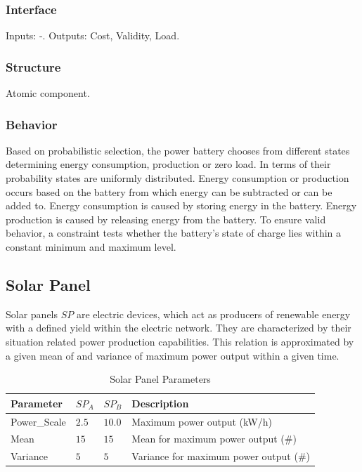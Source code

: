 \subsubsection{Interface}

Inputs: -. Outputs: Cost, Validity, Load.

\subsubsection{Structure}

Atomic component.

\subsubsection{Behavior}

Based on probabilistic selection, the power battery chooses from different states determining energy consumption, production or zero load. In terms of their probability states are uniformly distributed. Energy consumption or production occurs based on the battery from which energy can be subtracted or can be added to. Energy consumption is caused by storing energy in the battery. Energy production is caused by releasing energy from the battery. To ensure valid behavior, a constraint tests whether the battery's state of charge lies within a constant minimum and maximum level.

\subsection{Solar Panel}

Solar panels $SP$ are electric devices, which act as producers of renewable energy with a defined yield within the electric network. They are characterized by their situation related power production capabilities. This relation is approximated by a given mean of and variance of maximum power output within a given time.

\begin{table}[h]
	\renewcommand{\arraystretch}{1.3}
	\caption{Solar Panel Parameters}
	\centering
	\begin{tabular}{llll}
		\hline
		\textbf{Parameter}                     & \textbf{$SP_{A}$} & \textbf{$SP_{B}$} & \textbf{Description} \\ \hline
		Power\_Scale                       	   & $2.5$ & $10.0$ & Maximum power output (kW/h) \\
		Mean                       	  		  & $15$ & $15$ & Mean for maximum power output (\#) \\
		Variance                       	       & $5$ & $5$ & Variance for maximum power output (\#) \\ \hline
	\end{tabular}
\end{table}

